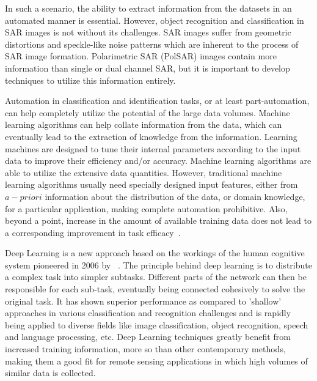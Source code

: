 In such a scenario, the ability to extract information from the datasets in an automated manner is essential. However, object recognition and classification in SAR images is not without its challenges. SAR images suffer from geometric distortions and speckle-like noise patterns which are inherent to the process of SAR image formation. Polarimetric SAR (PolSAR) images contain more information than single or dual channel SAR, but it is important to develop techniques to utilize this information entirely.  

Automation in classification and identification tasks, or at least part-automation, can help completely utilize the potential of the large data volumes. Machine learning algorithms can help collate information from the data, which can eventually lead to the extraction of knowledge from the information. Learning machines are designed to tune their internal parameters according to the input data to improve their efficiency and/or accuracy. Machine learning algorithms are able to utilize the extensive data quantities. However, traditional machine learning algorithms usually need specially designed input features, either from $a-priori$ information about the distribution of the data, or domain knowledge, for a particular application, making complete automation prohibitive. Also, beyond a point, increase in the amount of available training data does not lead to a corresponding improvement in task efficacy~\cite{bengio2009learning}.

Deep Learning is a new approach based on the workings of the human cognitive system pioneered in 2006 by ~\cite{hinton2006fast}. The principle behind deep learning is to distribute a complex task into simpler subtasks. Different parts of the network can then be responsible for each sub-task, eventually being connected cohesively to solve the original task. It has shown superior performance as compared to 'shallow' approaches in various classification and recognition challenges and is rapidly being applied to diverse fields like image classification, object recognition, speech and language processing, etc. Deep Learning techniques greatly benefit from increased training information, more so than other contemporary methods, making them a good fit for remote sensing applications in which high volumes of similar data is collected.  


